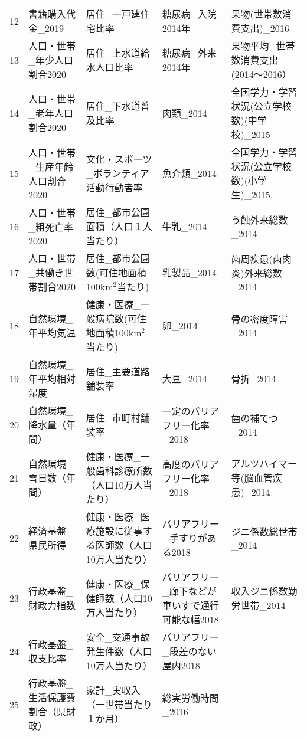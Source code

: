 \begin{table}[ht]
\begin{adjustbox}{width=.5\textwidth}
\begin{adjustbox}{width=.5\textwidth}
\begin{adjustbox}{width=.5\textwidth}
\begin{tabular}{rllll}
  12 & 書籍購入代金\_2019 & 居住\_一戸建住宅比率 & 糖尿病\_入院2014年 & 果物(世帯数消費支出)\_2016 \\
  13 & 人口・世帯\_年少人口割合2020 & 居住\_上水道給水人口比率 & 糖尿病\_外来2014年 & 果物平均\_世帯数消費支出(2014〜2016） \\
  14 & 人口・世帯\_老年人口割合2020 & 居住\_下水道普及比率 & 肉類\_2014 & 全国学力・学習状況(公立学校数)(中学校)\_2015 \\
  15 & 人口・世帯\_生産年齢人口割合2020 & 文化・スポーツ\_ボランティア活動行動者率 & 魚介類\_2014 & 全国学力・学習状況(公立学校数)(小学生)\_2015 \\
  16 & 人口・世帯\_粗死亡率2020 & 居住\_都市公園面積（人口１人当たり） & 牛乳\_2014 & う蝕外来総数\_2014 \\
  17 & 人口・世帯\_共働き世帯割合2020 & 居住\_都市公園数(可住地面積100km$^2$当たり) & 乳製品\_2014 & 歯周疾患(歯肉炎)外来総数\_2014 \\
  18 & 自然環境\_年平均気温 & 健康・医療\_一般病院数(可住地面積100km$^2$当たり) & 卵\_2014 & 骨の密度障害\_2014 \\
  19 & 自然環境\_年平均相対湿度 & 居住\_主要道路舗装率 & 大豆\_2014 & 骨折\_2014 \\
  20 & 自然環境\_降水量（年間） & 居住\_市町村舗装率 & 一定のバリアフリー化率\_2018 & 歯の補てつ\_2014 \\
  21 & 自然環境\_雪日数（年間） & 健康・医療\_一般歯科診療所数（人口10万人当たり） & 高度のバリアフリー化率\_2018 & アルツハイマー等(脳血管疾患)\_2014 \\
  22 & 経済基盤\_県民所得 & 健康・医療\_医療施設に従事する医師数（人口10万人当たり） & バリアフリー\_手すりがある2018 & ジニ係数総世帯\_2014 \\
  23 & 行政基盤\_財政力指数 & 健康・医療\_保健師数（人口10万人当たり） & バリアフリー\_廊下などが車いすで通行可能な幅2018 & 収入ジニ係数勤労世帯\_2014 \\
  24 & 行政基盤\_収支比率 & 安全\_交通事故発生件数（人口10万人当たり） & バリアフリー\_段差のない屋内2018 &  \\
  25 & 行政基盤\_生活保護費割合（県財政） & 家計\_実収入（一世帯当たり１か月） & 総実労働時間\_2016 &  \\
   \hline
\end{tabular}
\end{adjustbox}

\end{adjustbox}

\end{adjustbox}

\endgroup
\end{table}
